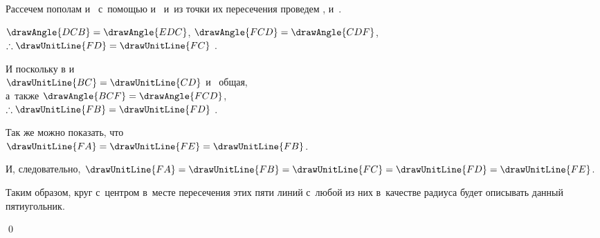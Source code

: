 \documentclass[letters,booklanguage=russian]{byrnebook}
\begin{document}
\begin{center}
Рассечем пополам  и~ с~помощью  и~ и~из точки их пересечения проведем ,  и~.

$\drawAngle{DCB} = \drawAngle{EDC}$, $\drawAngle{FCD} = \drawAngle{CDF}$,\\
$\therefore \drawUnitLine{FD} = \drawUnitLine{FC}$ .

И поскольку в
и
\\
$\drawUnitLine{BC} = \drawUnitLine{CD}$ и~ общая,\\
а~также $\drawAngle{BCF} = \drawAngle{FCD}$,\\
$\therefore \drawUnitLine{FB} = \drawUnitLine{FD}$ .

Так же можно показать, что\\
$\drawUnitLine{FA} = \drawUnitLine{FE} = \drawUnitLine{FB}$.

И, следовательно, $\drawUnitLine{FA} = \drawUnitLine{FB} = \drawUnitLine{FC} = \drawUnitLine{FD} = \drawUnitLine{FE}$.
\end{center}

Таким образом, круг с~центром в~месте пересечения этих пяти линий с~любой из них в~качестве радиуса будет описывать данный пятиугольник.

\qed
\end{document}
